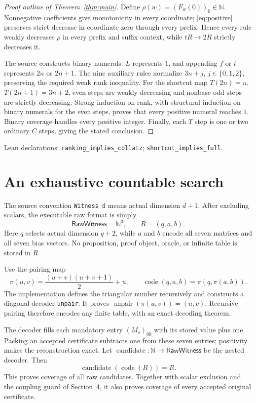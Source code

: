 \documentclass[11pt,a4paper]{article}
\theoremstyle{definition}
\newcommand{\NN}{\mathbb N}
\newcommand{\Raw}{\mathsf{RawWitness}}
\newcommand{\name}[1]{{\small\texttt{#1}}}
\newcommand{\source}[1]{\par{\footnotesize\color{ink}Lean declarations: #1.}\par}
\begin{document}
\begin{proof}[Proof outline of Theorem~\ref{thm:main}]
Define $\rho(w)=(F_w(0))_0\in\NN$. Nonnegative coefficients give monotonicity
in every coordinate; \eqref{eq:positive} preserves strict decrease in coordinate
zero through every prefix. Hence every rule weakly decreases $\rho$ in every
prefix and suffix context, while $tR\to2R$ strictly decreases it.

The source constructs binary numerals: $L$ represents $1$, and appending $f$
or $t$ represents $2n$ or $2n+1$. The nine auxiliary rules normalize
$3n+j$, $j\in\{0,1,2\}$, preserving the required weak rank inequality.
For the shortcut map $T(2n)=n$, $T(2n+1)=3n+2$, even steps are weakly
decreasing and nonbase odd steps are strictly decreasing. Strong induction
on rank, with structural induction on binary numerals for the even steps,
proves that every positive numeral reaches $1$. Binary coverage handles
every positive integer. Finally, each $T$ step is one or two ordinary $C$
steps, giving the stated conclusion.
\end{proof}
\source{\name{ranking\_implies\_collatz}; \name{shortcut\_implies\_full}}

\newpage
\section{An exhaustive countable search}
The source convention \name{Witness d} means actual dimension $d+1$.
After excluding scalars, the executable raw format is simply
\[
 \Raw=\NN^3,\qquad R=(q,a,b).
\]
Here $q$ selects actual dimension $q+2$, while $a$ and $b$ encode all seven
matrices and all seven bias vectors. No proposition, proof object, oracle,
or infinite table is stored in $R$.

Use the pairing map
\[
 \pi(u,v)=\frac{(u+v)(u+v+1)}2+u,
 \qquad
 \operatorname{code}(q,a,b)=\pi(q,\pi(a,b)).
\]
The implementation defines the triangular number recursively and constructs a
diagonal decoder \name{unpair}. It proves
$\operatorname{unpair}(\pi(u,v))=(u,v)$. Recursive pairing therefore encodes
any finite table, with an exact decoding theorem.

The decoder fills each mandatory entry $(M_s)_{00}$ with its stored value
plus one. Packing an accepted certificate subtracts one from these seven
entries; positivity makes the reconstruction exact. Let
$\operatorname{candidate}:\NN\to\Raw$ be the nested decoder. Then
\[
 \operatorname{candidate}(\operatorname{code}(R))=R.
\]
This proves coverage of all raw candidates. Together with scalar exclusion
and the coupling guard of Section~4, it also proves coverage of every accepted
original certificate.
\end{document}
